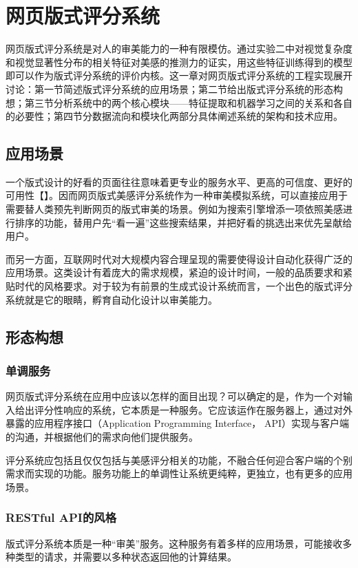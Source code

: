\chapter{网页版式评分系统}
\label{chap:application}

网页版式评分系统是对人的审美能力的一种有限模仿。通过实验二中对视觉复杂度和视觉显著性分布的相关特征对美感的推测力的证实，用这些特征训练得到的模型即可以作为版式评分系统的评价内核。这一章对网页版式评分系统的工程实现展开讨论：第一节简述版式评分系统的应用场景；第二节给出版式评分系统的形态构想；第三节分析系统中的两个核心模块——特征提取和机器学习之间的关系和各自的必要性；第四节分数据流向和模块化两部分具体阐述系统的架构和技术应用。

\section{应用场景}
一个版式设计的好看的页面往往意味着更专业的服务水平、更高的可信度、更好的可用性【】。因而网页版式美感评分系统作为一种审美模拟系统，可以直接应用于需要替人类预先判断网页的版式审美的场景。例如为搜索引擎增添一项依照美感进行排序的功能，替用户先“看一遍”这些搜索结果，并把好看的挑选出来优先呈献给用户。

而另一方面，互联网时代对大规模内容合理呈现的需要使得设计自动化获得广泛的应用场景。这类设计有着庞大的需求规模，紧迫的设计时间，一般的品质要求和紧贴时代的风格要求。对于较为有前景的生成式设计系统而言，一个出色的版式评分系统就是它的眼睛，孵育自动化设计以审美能力。

\section{形态构想}
\subsection{单调服务}
网页版式评分系统在应用中应该以怎样的面目出现？可以确定的是，作为一个对输入给出评分性响应的系统，它本质是一种服务。它应该运作在服务器上，通过对外暴露的应用程序接口（Application Programming Interface， API）实现与客户端的沟通，并根据他们的需求向他们提供服务。

评分系统应包括且仅仅包括与美感评分相关的功能，不融合任何迎合客户端的个别需求而实现的功能。服务功能上的单调性让系统更纯粹，更独立，也有更多的应用场景。

\subsection{RESTful API的风格}
版式评分系统本质是一种“审美”服务。这种服务有着多样的应用场景，可能接收多种类型的请求，并需要以多种状态返回他的计算结果。

